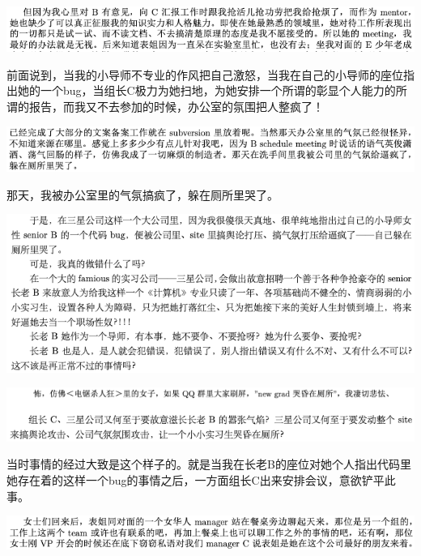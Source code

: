 \documentclass[9pt, b5paper]{article}
\begin{document}
\begin{center}
\includegraphics[width=.9\linewidth]{./pic/backups_plans_20210507_091504.png}
\end{center}

前面说到，当我的小导师不专业的作风把自己激怒，当我在自己的小导师的座位指出她的一个bug，当组长C极力为她扫地，为她安排一个所谓的彰显个人能力的所谓的报告，而我又不去参加的时候，办公室的氛围把人整疯了！

\begin{center}
\includegraphics[width=.9\linewidth]{./pic/backups_plans_20210507_091648.png}
\end{center}

那天，我被办公室里的气氛搞疯了，躲在厕所里哭了。 

\begin{center}
\includegraphics[width=.9\linewidth]{./pic/backups_plans_20210507_091755.png}
\end{center}

\begin{center}
\includegraphics[width=.9\linewidth]{./pic/backups_plans_20210507_091828.png}
\end{center}

当时事情的经过大致是这个样子的。就是当我在长老B的座位对她个人指出代码里她存在着的这样一个bug的事情之后，一方面组长C出来安排会议，意欲铲平此事。

\begin{center}
\includegraphics[width=.9\linewidth]{./pic/backups_plans_20210507_135417.png}
\end{center}
\end{document}
